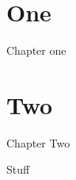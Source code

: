 \documentclass{article}
\begin{document}
\section{One}
Chapter one
\section{Two}
Chapter Two


Stuff
\end{document}

